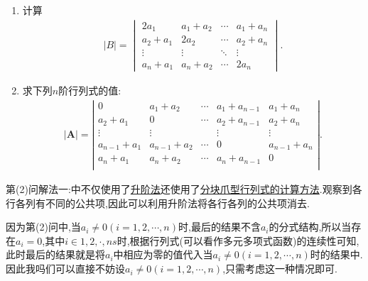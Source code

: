 \documentclass[../../main.tex]{subfiles}%
\begin{document}
\begin{example}
\begin{enumerate}[(1)]
\item 计算
\begin{align*}
|B| = 
\begin{vmatrix}
2a_1 & a_1 + a_2 & \cdots & a_1 + a_n \\
a_2 + a_1 & 2a_2 & \cdots & a_2 + a_n \\
\vdots & \vdots & \ddots & \vdots \\
a_n + a_1 & a_n + a_2 & \cdots & 2a_n
\end{vmatrix}.
\end{align*}

\item 求下列$n$阶行列式的值:
\begin{align*}
|\boldsymbol{A}|=\left| \begin{matrix}
0&		a_1+a_2&		\cdots&		a_1+a_{n-1}&		a_1+a_n\\
a_2+a_1&		0&		\cdots&		a_2+a_{n-1}&		a_2+a_n\\
\vdots&		\vdots&		&		\vdots&		\vdots\\
a_{n-1}+a_1&		a_{n-1}+a_2&		\cdots&		0&		a_{n-1}+a_n\\
a_n+a_1&		a_n+a_2&		\cdots&		a_n+a_{n-1}&		0\\
\end{matrix} \right|.
\end{align*}
\end{enumerate}
\end{example}
\begin{note}
第(2)问{\color{blue}解法一:}中不仅使用了\hyperlink{行列式计算:升阶法}{升阶法}还使用了\hyperref[proposition:分块爪型行列式]{分块爪型行列式的计算方法}.观察到各行各列有不同的公共项,因此可以利用升阶法将各行各列的公共项消去.
\end{note}
\begin{remark}
因为第(2)问中,当$a_i\ne 0(i=1,2,\cdots,n)$时,最后的结果不含$a_i$的分式结构,所以当存在$a_i=0$,其中$i\in{1,2,\cdot,ns}$时,根据行列式(可以看作多元多项式函数)的连续性可知,此时最后的结果就是将$a_i$中相应为零的值代入当$a_i\ne 0(i=1,2,\cdots,n)$时的结果中.因此我吗们可以直接不妨设$a_i\ne 0(i=1,2,\cdots,n)$,只需考虑这一种情况即可.
\end{remark}
\end{document}
